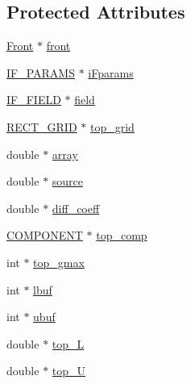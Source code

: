 \subsection*{Protected Attributes}
\begin{DoxyCompactItemize}
\item 
\hyperlink{fdecs_8h_ac32202b798f848095c489cfd04c4ca5f}{Front} $\ast$ \hyperlink{class_incompress___solver___smooth___basis_ab792d371ca86ec9ed21b4c95d1375a0b}{front}
\item 
\hyperlink{i_fluid_8h_d8/d1e/struct_i_f___p_a_r_a_m_s}{I\+F\+\_\+\+P\+A\+R\+A\+MS} $\ast$ \hyperlink{class_incompress___solver___smooth___basis_a8d8d786aa53fea726a52715c3f8caefc}{i\+Fparams}
\item 
\hyperlink{i_fluid_8h_a2b9d43f92a76a1ecbc4a940ad9edb5d8}{I\+F\+\_\+\+F\+I\+E\+LD} $\ast$ \hyperlink{class_incompress___solver___smooth___basis_a8cb594f11e27f7f9e74d414f16f8bf20}{field}
\item 
\hyperlink{geom_8h_a983fdb6b46c9b99969bffa62eae7d31d}{R\+E\+C\+T\+\_\+\+G\+R\+ID} $\ast$ \hyperlink{class_incompress___solver___smooth___basis_a70474023fb531a88f35d21e3c1e67f70}{top\+\_\+grid}
\item 
double $\ast$ \hyperlink{class_incompress___solver___smooth___basis_ad6665e3a882f7cc98fa27f252f443a6a}{array}
\item 
double $\ast$ \hyperlink{class_incompress___solver___smooth___basis_ab571615b4743bbd36e8eea358f7a7eed}{source}
\item 
double $\ast$ \hyperlink{class_incompress___solver___smooth___basis_a8c7b22a7f2e1e1a461ab929cc6b7239e}{diff\+\_\+coeff}
\item 
\hyperlink{int_8h_a2bb7be12ca59ea6443c8757df0a7c278}{C\+O\+M\+P\+O\+N\+E\+NT} $\ast$ \hyperlink{class_incompress___solver___smooth___basis_aeab9406511f09a20b9ac8fa110b128e6}{top\+\_\+comp}
\item 
int $\ast$ \hyperlink{class_incompress___solver___smooth___basis_a393216337d81a2bc94f5263e1b79ae4a}{top\+\_\+gmax}
\item 
int $\ast$ \hyperlink{class_incompress___solver___smooth___basis_a09e96680610922612dc03030801fb0c8}{lbuf}
\item 
int $\ast$ \hyperlink{class_incompress___solver___smooth___basis_ae2f78a30196de260ba67c1af65eb6d8a}{ubuf}
\item 
double $\ast$ \hyperlink{class_incompress___solver___smooth___basis_aafeefab070c926e03bb91edcbd25d4a5}{top\+\_\+L}
\item 
double $\ast$ \hyperlink{class_incompress___solver___smooth___basis_a1c8b0acd591d349f95db19942e7ebade}{top\+\_\+U}

\end{DoxyCompactItemize}
